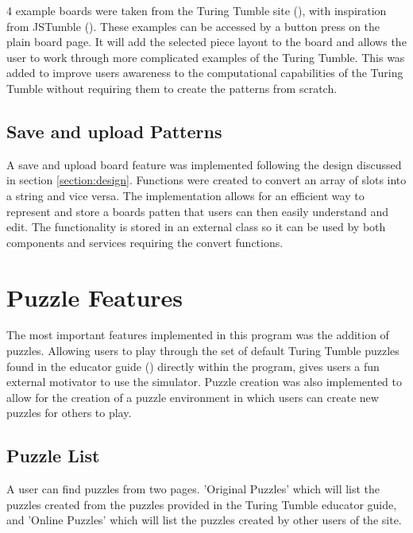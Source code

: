 \documentclass{l4proj}
\begin{document}
4 example boards were taken from the Turing Tumble site (\cite{turing_tumble_site}), with inspiration from JSTumble (\cite{jstumble}). These examples can be accessed by a button press on the plain board page. It will add the selected piece layout to the board and allows the user to work through more complicated examples of the Turing Tumble. This was added to improve users awareness to the computational capabilities of the Turing Tumble without requiring them to create the patterns from scratch. 

\subsection{Save and upload Patterns}
A save and upload board feature was implemented following the design discussed in section \ref{section:design}. Functions were created to convert an array of slots into a string and vice versa. The implementation allows for an efficient way to represent and store a boards patten that users can then easily understand and edit. The functionality is stored in an external class so it can be used by both components and services requiring the convert functions.

\section{Puzzle Features}
The most important features implemented in this program was the addition of puzzles. Allowing users to play through the set of default Turing Tumble puzzles found in the educator guide (\cite{educator_resources}) directly within the program, gives users a fun external motivator to use the simulator. Puzzle creation was also implemented to allow for the creation of a puzzle environment in which users can create new puzzles for others to play.

\subsection{Puzzle List}
A user can find puzzles from two pages. 'Original Puzzles' which will list the puzzles created from the puzzles provided in the Turing Tumble educator guide, and 'Online Puzzles' which will list the puzzles created by other users of the site.
\end{document}
